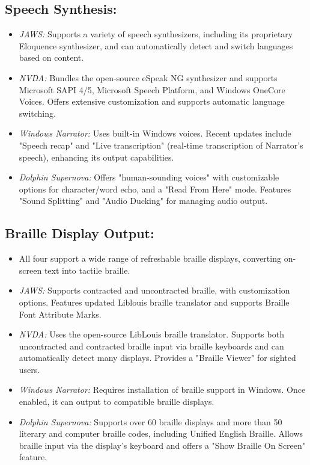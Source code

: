 \subsection*{Speech Synthesis:}
\begin{itemize}
    \item \emph{JAWS:} Supports a variety of speech synthesizers, including its proprietary Eloquence synthesizer, and can automatically detect and switch languages based on content.\cite{JAWSWhatsNew}
    \item \emph{NVDA:} Bundles the open-source eSpeak NG synthesizer and supports Microsoft SAPI 4/5, Microsoft Speech Platform, and Windows OneCore Voices. Offers extensive customization and supports automatic language switching.\cite{NVDASpeech}
    \item \emph{Windows Narrator:} Uses built-in Windows voices. Recent updates include "Speech recap" and "Live transcription" (real-time transcription of Narrator's speech), enhancing its output capabilities.\cite{NarratorWhatsNew}
    \item \emph{Dolphin Supernova:} Offers "human-sounding voices" with customizable options for character/word echo, and a "Read From Here" mode. Features "Sound Splitting" and "Audio Ducking" for managing audio output.\cite{SuperNovaSpeech}
\end{itemize}

\subsection*{Braille Display Output:}
\begin{itemize}
    \item All four support a wide range of refreshable braille displays, converting on-screen text into tactile braille.
    \item \emph{JAWS:} Supports contracted and uncontracted braille, with customization options. Features updated Liblouis braille translator and supports Braille Font Attribute Marks.\cite{JAWSBraille}
    \item \emph{NVDA:} Uses the open-source LibLouis braille translator. Supports both uncontracted and contracted braille input via braille keyboards and can automatically detect many displays. Provides a "Braille Viewer" for sighted users.\cite{NVDABraille}
    \item \emph{Windows Narrator:} Requires installation of braille support in Windows. Once enabled, it can output to compatible braille displays.\cite{NarratorBraille}
    \item \emph{Dolphin Supernova:} Supports over 60 braille displays and more than 50 literary and computer braille codes, including Unified English Braille. Allows braille input via the display's keyboard and offers a "Show Braille On Screen" feature.\cite{SuperNovaBraille}
\end{itemize}

